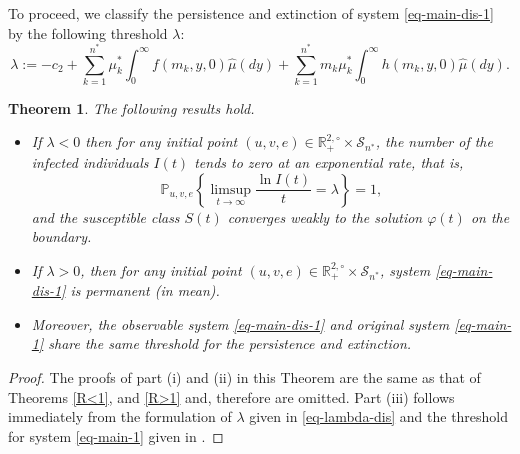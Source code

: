 \documentclass[12pt]{amsart}
\newtheorem{thm}{Theorem}[section]
\theoremstyle{remark}
\numberwithin{equation}{section}
\newcommand{\PP}{\mathbb{P}}
\numberwithin{equation}{section}
\newcommand{\wdt}{\widetilde}
\newcommand{\1}{\boldsymbol{1}}
\def\hat{\widehat}
\begin{document}
To proceed,
we classify the persistence and extinction of  system \eqref{eq-main-dis-1} by
the following threshold $\lambda$:
\begin{equation}\label{eq-lambda-dis}
\lambda:=-c_2+\sum_{k=1}^{n^*}\mu^*_k\int_0^\infty f(m_k,y,0)\hat\mu(dy)+\sum_{k=1}^{n^*} m_k\mu^*_k\int_0^\infty h(m_k,y,0)\hat\mu(dy).
\end{equation}


\begin{thm}\label{thm-same}
The following results hold.
	\begin{itemize}
		\item [\rm{(i)}]
If $\lambda<0$ then for any initial point $(u,v,e)\in\mathbb{R}_+^{2,\circ}\times\mathcal S_{n^*}$,
the number of the infected individuals $I(t)$ tends to zero  at an exponential rate, that is, %
$$\PP_{u,v,e}\left\{\limsup\limits_{t\to\infty}\dfrac{\ln I(t)}{t}=\lambda\right\}=1,$$
and the susceptible class $S(t)$ converges weakly to the solution $\varphi(t)$ on the boundary.

\item [\rm{(ii)}] If $\lambda>0$, then for any initial  point $(u,v,e)\in \mathbb{R}_+^{2,\circ}\times\mathcal S_{n^*}$,
system \eqref{eq-main-dis-1} is permanent (in mean).
\item [\rm{(iii)}]
Moreover, the observable system \eqref{eq-main-dis-1} and original
system \eqref{eq-main-1} share the same threshold for the persistence and extinction.
	\end{itemize}
\end{thm}

\begin{proof}
	The proofs of part (i) and (ii) in this Theorem are the same as that of Theorems \ref{R<1}, and \ref{R>1} and, therefore are omitted.
Part (iii) follows immediately from the formulation of $\lambda$ given in \eqref{eq-lambda-dis} and the threshold for system \eqref{eq-main-1} given in \cite{DNY-SPA}.
\end{proof}

%	
%
\end{document}
